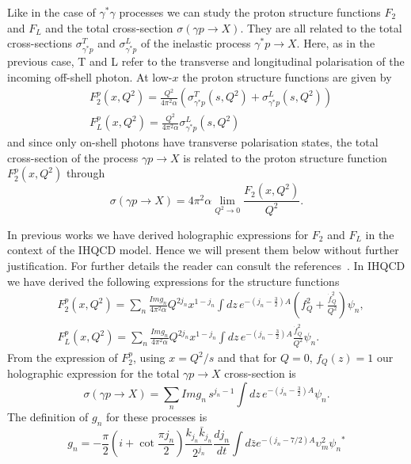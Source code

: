 \documentclass[preprint, 12pt]{elsarticle}
\begin{document}
Like in the case of $\gamma^{*} \gamma$ processes we can study the proton structure functions $F_2$ and $F_L$ and the total cross-section $\sigma\left(\gamma p \rightarrow X\right)$. They are all related to the total cross-sections $\sigma^T_{\gamma^* p}$ and $\sigma^L_{\gamma^{*} p}$ of the inelastic process $\gamma^{*} p \rightarrow X$. Here, as in the previous case, T and L refer to the transverse and longitudinal polarisation of the incoming off-shell photon. At low-$x$ the proton structure functions are given by
\begin{align}
&F_2^p\left(x, Q^2\right) = \frac{Q^2}{4 \pi^2 \alpha} \left( \sigma^T_{\gamma^* p}\left(s, Q^2\right) +  \sigma^L_{\gamma^* p}\left(s, Q^2\right)   \right) \\
&F_L^p\left(x, Q^2\right) = \frac{Q^2}{4 \pi^2 \alpha}  \sigma^L_{\gamma^* p}\left(s, Q^2\right)
\end{align}
and since only on-shell photons have transverse polarisation states, the total cross-section of the process $\gamma p \rightarrow X$ is related to the proton structure function $F_2^p\left(x, Q^2\right)$ through
\begin{equation}
\sigma\left(\gamma p \rightarrow X\right) = 4 \pi^2 \alpha \lim_{Q^2 \rightarrow 0} \frac{F_2\left(x, Q^2\right)}{Q^2}.
\end{equation}

In previous works we have derived holographic expressions for $F_2$ and $F_L$ in the context of the IHQCD model. Hence we will present them below without further justification. For further details the reader can consult the references~\cite{ballon_bayona_unity_2017, Amorim:2018yod, gluonPDF_IHQCD_2020}. 
In IHQCD we have derived the following expressions for the structure functions
\begin{align}
&F_2^p(x, Q^2) = \sum_{n} \frac{ Im g_n}{4 \pi^2 \alpha} Q^{2 j_n} x^{1-j_n} \int dz \,e^{-\left(j_n-\frac{3}{2}\right)A}  \left( f_Q^2  +  \frac{\dot{f}_Q^{2}}{Q^2}      \right) \psi_n , \\
&F_L^p(x, Q^2) = \sum_{n} \frac{Im g_n}{4 \pi^2 \alpha} Q^{2 j_n} x^{1-j_n} \int dz \,e^{-\left(j_n-\frac{3}{2}\right)A}  \frac{\dot{f}_Q^{2}}{Q^2}  \psi_n.
\end{align}
From the expression of $F_2^p$, using $x = Q^2 / s$ and that for $Q = 0, \, f_Q\left(z\right) = 1$ our holographic expression for the total  $\gamma p \rightarrow X$ cross-section is
\begin{equation}
\sigma\left(\gamma p \rightarrow X\right) =  \sum_{n} Im g_n \, s^{j_n -1 } \int dz \,e^{-\left(j_n-\frac{3}{2}\right)A}  \psi_n.
\end{equation}
The definition of $g_n$ for these processes is
\begin{equation}
g_n = - \frac{\pi}{2} \left( i + \cot \frac{\pi j_n}{2} \right) \frac{k_{j_n} \bar{k}_{j_n}}{2^{j_n}} \frac{d j_n}{dt} \int d\bar{z} e^{-\left(j_n - 7/2 \right)A} \upsilon_m^2 {\psi_n}^*
\end{equation}
\end{document}
